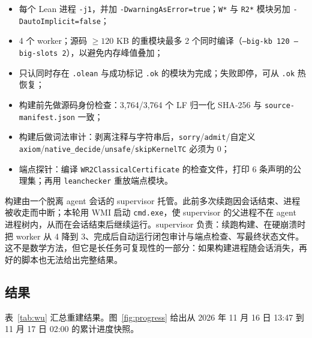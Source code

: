 \documentclass[11pt,a4paper]{ctexart}
\theoremstyle{plain}
\theoremstyle{definition}
\begin{document}
\begin{itemize}
\item 每个 Lean 进程 \texttt{-j1}，并加 \texttt{-DwarningAsError=true}；\texttt{W*} 与 \texttt{R2*} 模块另加 \texttt{-DautoImplicit=false}；
\item 4 个 worker；源码 $\ge120$ KB 的重模块最多 2 个同时编译（\texttt{--big-kb 120 --big-slots 2}），以避免内存峰值叠加；
\item 只认同时存在 \texttt{.olean} 与成功标记 \texttt{.ok} 的模块为完成；失败即停，可从 \texttt{.ok} 热恢复；
\item 构建前先做源码身份检查：3,764/3,764 个 LF 归一化 SHA-256 与 \texttt{source-manifest.json} 一致；
\item 构建后做词法审计：剥离注释与字符串后，\texttt{sorry}/\texttt{admit}/自定义 \texttt{axiom}/\texttt{native\_decide}/\texttt{unsafe}/\texttt{skipKernelTC} 必须为 0；
\item 端点探针：编译 \texttt{WR2ClassicalCertificate} 的检查文件，打印 6 条声明的公理集；再用 \texttt{leanchecker} 重放端点模块。
\end{itemize}

构建由一个脱离 agent 会话的 supervisor 托管。此前多次续跑因会话结束、进程被收走而中断；本轮用 WMI 启动 \texttt{cmd.exe}，使 supervisor 的父进程不在 agent 进程树内，从而在会话结束后继续运行。supervisor 负责：续跑构建、在硬崩溃时把 worker 从 4 降到 3、完成后自动运行闭包审计与端点检查、写最终状态文件。这不是数学方法，但它是长任务可复现性的一部分：如果构建进程随会话消失，再好的脚本也无法给出完整结果。

\subsection{结果}
\label{sec:wu-results}

表~\ref{tab:wu} 汇总重建结果。图~\ref{fig:progress} 给出从 2026 年 11 月 16 日 13:47 到 11 月 17 日 02:00 的累计进度快照。
\end{document}
